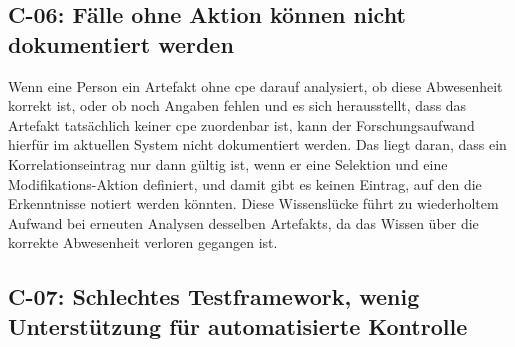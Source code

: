 \subsection{C-06: Fälle ohne Aktion können nicht dokumentiert werden}\label{subsec:c-06-falle-ohne-aktion-konnen-nicht-dokumentiert-werden}


Wenn eine Person ein Artefakt ohne \acrshort{cpe} darauf analysiert, ob diese Abwesenheit korrekt ist, oder ob noch Angaben fehlen und es sich herausstellt, dass das Artefakt tatsächlich keiner \acrshort{cpe} zuordenbar ist, kann der Forschungsaufwand hierfür im aktuellen System nicht dokumentiert werden.
Das liegt daran, dass ein Korrelationseintrag nur dann gültig ist, wenn er eine Selektion und eine Modifikations-Aktion definiert, und damit gibt es keinen Eintrag, auf den die Erkenntnisse notiert werden könnten.
Diese Wissenslücke führt zu wiederholtem Aufwand bei erneuten Analysen desselben Artefakts, da das Wissen über die korrekte Abwesenheit verloren gegangen ist.

\subsection{C-07: Schlechtes Testframework, wenig Unterstützung für automatisierte Kontrolle}\label{subsec:c-07-test-framework}


